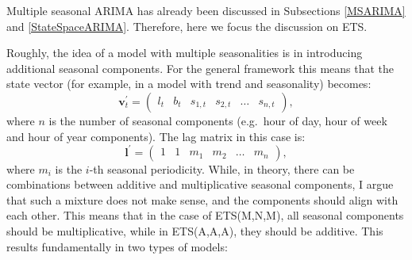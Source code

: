 \documentclass[]{book}
\theoremstyle{definition}
\theoremstyle{definition}
\theoremstyle{definition}
\theoremstyle{definition}
\theoremstyle{remark}
\begin{document}
Multiple seasonal ARIMA has already been discussed in Subsections \ref{MSARIMA} and \ref{StateSpaceARIMA}. Therefore, here we focus the discussion on ETS.

Roughly, the idea of a model with multiple seasonalities is in introducing additional seasonal components. For the general framework this means that the state vector (for example, in a model with trend and seasonality) becomes:
\begin{equation}
  \mathbf{v}_t^\prime =
    \begin{pmatrix}
    l_t & b_t & s_{1,t} & s_{2,t} & \dots & s_{n,t}
    \end{pmatrix},
  \label{eq:ETSADAMSeasonalMultiStateVector}
\end{equation}
where \(n\) is the number of seasonal components (e.g.~hour of day, hour of week and hour of year components). The lag matrix in this case is:
\begin{equation}
  \mathbf{l}^\prime=\begin{pmatrix}1 & 1 & m_1 & m_2 & \dots & m_n \end{pmatrix},
  \label{eq:ETSADAMSeasonalMultiStateVectorLags}
\end{equation}
where \(m_i\) is the \(i\)-th seasonal periodicity. While, in theory, there can be combinations between additive and multiplicative seasonal components, I argue that such a mixture does not make sense, and the components should align with each other. This means that in the case of ETS(M,N,M), all seasonal components should be multiplicative, while in ETS(A,A,A), they should be additive. This results fundamentally in two types of models:
\end{document}

